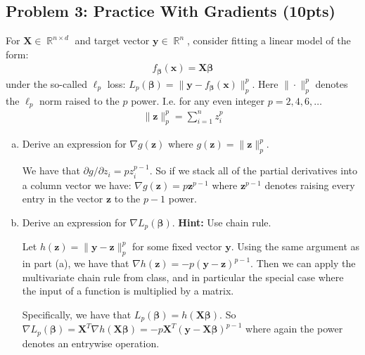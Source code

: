 \documentclass[10pt]{article}
\newcommand{\bs}[1]{\boldsymbol{#1}}
\newcommand{\bv}[1]{\mathbf{#1}}
\DeclareMathOperator{\R}{\mathbb{R}}
\begin{document}
\newpage
\subsection{Problem 3: Practice With Gradients (10pts)}
For $\bv{X} \in \R^{n\times d}$ and target vector $\bv{y} \in \R^n$, consider fitting a linear model of the form:
\begin{align*}
f_{\bs{\beta}}(\bv{x}) = \bv{X}\bs{\beta}
\end{align*}
under the so-called $\ell_p$ loss: $L_p(\bs{\beta}) = \|\bv{y} - f_{\bs{\beta}}(\bv{x})\|_p^p$. Here $\|\cdot \|_p^p$ denotes the $\ell_p$ norm raised to the $p$ power. I.e. for any even integer $p = 2,4,6, \ldots$
\begin{align*}
\|\bv{z}\|_p^p = \sum_{i=1}^n z_i^p
\end{align*}

\begin{enumerate}[(a)]
	\item Derive an expression for $\nabla g(\bv{z})$ where $g(\bv{z}) = \|\bv{z}\|_p^p$. 
	
	\color{blue}
	We have that $\partial g / \partial z_i = pz_i^{p-1}$. So if we stack all of the partial derivatives into a column vector we have: $\nabla g(\bv{z}) = p \bv{z}^{p-1}$ where $\bv{z}^{p-1}$ denotes raising every entry in the vector $\bv{z}$ to the $p-1$ power.
	\color{black}
	
	\item Derive an expression for $\nabla L_p(\bs{\beta})$. \textbf{Hint:} Use chain rule.
	
	\color{blue}
	Let $h(\bv{z}) = \|\bv{y} - \bv{z}\|_p^p$ for some fixed vector $\bv{y}$. Using the same argument as in part (a), we have that $\nabla h(\bv{z}) = - p \left(\bv{y} - \bv{z}\right)^{p-1}$. Then we can apply the multivariate chain rule from class, and in particular the special case where the input of a function is multiplied by a matrix. 
	
	Specifically, we have that $L_p(\bs{\beta}) = h(\bv{X}\bs{\beta})$. So $\nabla L_p(\bs{\beta})  = \bv{X}^T \nabla h(\bv{X}\bs{\beta}) = -p \bv{X}^T\left(\bv{y} - \bv{X}\bs{\beta}\right)^{p-1}$ where again the power denotes an entrywise operation.
	\color{black}
\end{enumerate}

\newpage
\end{document}
